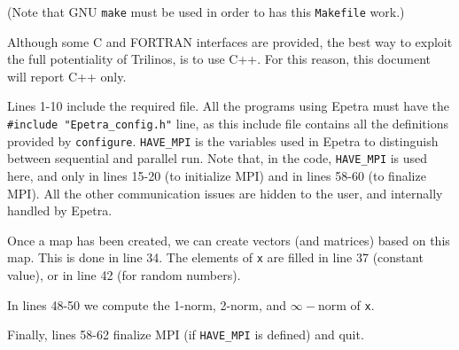 (Note that GNU \verb!make! must be used in order to has this
\verb!Makefile! work.)

\begin{remark}
  Although some C and FORTRAN interfaces are provided, the best way to
  exploit the full potentiality of Trilinos, is to use C++. For this
  reason, this document will report C++ only.
\end{remark}

Lines 1-10 include the required file. All the programs using Epetra must
have the \verb!#include "Epetra_config.h"! line, as this include file
contains all the definitions provided by {\tt configure}. \verb!HAVE_MPI!
is the variables used in Epetra to distinguish between sequential and
parallel run. Note that, in the code, \verb!HAVE_MPI! is used here, and
only in lines 15-20 (to initialize MPI) and in lines 58-60 (to finalize
MPI). All the other communication issues are hidden to the user, and
internally handled by Epetra. 

Once a map has been created, we can create vectors (and matrices) based
on this map. This is done in line 34. The elements of {\tt x} are filled
in line 37 (constant value), or in line 42 (for random numbers).

In lines 48-50 we compute the 1-norm, 2-norm, and $\infty-$norm
of {\tt x}.

Finally, lines 58-62 finalize MPI (if \verb!HAVE_MPI! is defined) and
quit.

